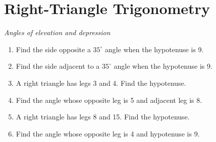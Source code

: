 \documentclass{article}
\begin{document}
\section*{Right-Triangle Trigonometry}
\textit{Angles of elevation and depression}
\begin{enumerate}
  \item Find the side opposite a $35^\circ$ angle when the hypotenuse is 9.
  \item Find the side adjacent to a $35^\circ$ angle when the hypotenuse is 9.
  \item A right triangle has legs 3 and 4. Find the hypotenuse.
  \item Find the angle whose opposite leg is 5 and adjacent leg is 8.
  \item A right triangle has legs 8 and 15. Find the hypotenuse.
  \item Find the angle whose opposite leg is 4 and hypotenuse is 9.
\end{enumerate}
\end{document}
